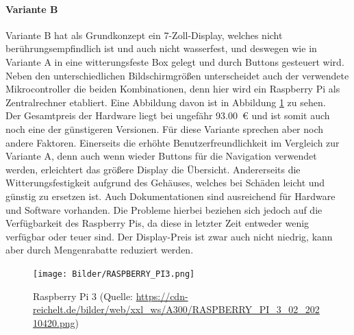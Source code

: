\paragraph{Variante B}
Variante B hat als Grundkonzept ein 7-Zoll-Display, welches nicht berührungsempfindlich ist und auch nicht wasserfest, und deswegen wie in Variante A in eine witterungsfeste Box gelegt und durch Buttons gesteuert wird. Neben den unterschiedlichen Bildschirmgrößen unterscheidet auch der verwendete Mikrocontroller die beiden Kombinationen, denn hier wird ein Raspberry Pi als Zentralrechner etabliert. Eine Abbildung davon ist in Abbildung \ref{fig:raspi3} zu sehen.\\
Der Gesamtpreis der Hardware liegt bei ungefähr 93.00 € und ist somit auch noch eine der günstigeren Versionen. Für diese Variante sprechen aber noch andere Faktoren. Einerseits die erhöhte Benutzerfreundlichkeit im Vergleich zur Variante A, denn auch wenn wieder Buttons für die Navigation verwendet werden, erleichtert das größere Display die Übersicht. Andererseits die Witterungsfestigkeit aufgrund des Gehäuses, welches bei Schäden leicht und günstig zu ersetzen ist. Auch Dokumentationen sind ausreichend für Hardware und Software vorhanden. Die Probleme hierbei beziehen sich jedoch auf die Verfügbarkeit des Raspberry Pis, da diese in letzter Zeit entweder wenig verfügbar oder teuer sind. Der Display-Preis ist zwar auch nicht niedrig, kann aber durch Mengenrabatte reduziert werden.
\begin{figure}[ht]
	\centering
	\texttt{[image: Bilder/RASPBERRY\_PI3.png]}
	\caption{Raspberry Pi 3 (Quelle: \url{https://cdn-reichelt.de/bilder/web/xxl_ws/A300/RASPBERRY_PI_3_02_20210420.png})}
	\label{fig:raspi3}
\end{figure}
